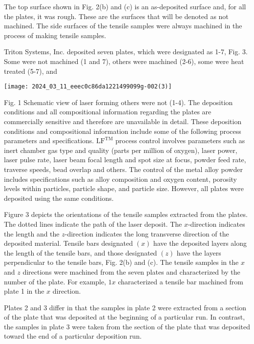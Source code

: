 \documentclass[10pt]{article}
\begin{document}
The top surface shown in Fig. 2(b) and (c) is an as-deposited surface and, for all the plates, it was rough. These are the surfaces that will be denoted as not machined. The side surfaces of the tensile samples were always machined in the process of making tensile samples.

Triton Systems, Inc. deposited seven plates, which were designated as 1-7, Fig. 3. Some were not machined (1 and 7), others were machined (2-6), some were heat treated (5-7), and

\begin{center}
\texttt{[image: 2024\_03\_11\_eeec0c86da1221499099g-002(3)]}
\end{center}

Fig. 1 Schematic view of laser forming others were not (1-4). The deposition conditions and all compositional information regarding the plates are commercially sensitive and therefore are unavailable in detail. These deposition conditions and compositional information include some of the following process parameters and specifications. $\mathrm{LF}^{\mathrm{TM}}$ process control involves parameters such as inert chamber gas type and quality (parts per million of oxygen), laser power, laser pulse rate, laser beam focal length and spot size at focus, powder feed rate, traverse speeds, bead overlap and others. The control of the metal alloy powder includes specifications such as alloy composition and oxygen content, porosity levels within particles, particle shape, and particle size. However, all plates were deposited using the same conditions.

Figure 3 depicts the orientations of the tensile samples extracted from the plates. The dotted lines indicate the path of the laser deposit. The $x$-direction indicates the length and the $z$-direction indicates the long transverse direction of the deposited material. Tensile bars designated $(x)$ have the deposited layers along the length of the tensile bars, and those designated $(z)$ have the layers perpendicular to the tensile bars, Fig. 2(b) and (c). The tensile samples in the $x$ and $z$ directions were machined from the seven plates and characterized by the number of the plate. For example, $1 x$ characterized a tensile bar machined from plate 1 in the $x$ direction.

Plates 2 and 3 differ in that the samples in plate 2 were extracted from a section of the plate that was deposited at the beginning of a particular run. In contrast, the samples in plate 3 were taken from the section of the plate that was deposited toward the end of a particular deposition run.
\end{document}
